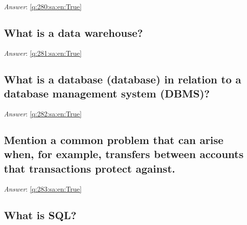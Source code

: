 \documentclass[a4paper,11pt,oneside]{article}
\begin{document}
\begin{sloppypar}
\textit{Answer}: \autoref{q:280:sa:en:True}



\subsection{What is a data warehouse?}

\label{q:281:sa:en:False}

\vspace{2cm}

\noindent\makebox[\textwidth]{\hrulefill}

\vspace{1cm}

\textit{Answer}: \autoref{q:281:sa:en:True}



\subsection{What is a database (database) in relation to a database management system (DBMS)?}

\label{q:282:sa:en:False}

\vspace{2cm}

\noindent\makebox[\textwidth]{\hrulefill}

\vspace{1cm}

\textit{Answer}: \autoref{q:282:sa:en:True}



\subsection{Mention a common problem that can arise when, for example, transfers between accounts that transactions protect against.}

\label{q:283:sa:en:False}

\vspace{2cm}

\noindent\makebox[\textwidth]{\hrulefill}

\vspace{1cm}

\textit{Answer}: \autoref{q:283:sa:en:True}



\subsection{What is SQL?}


\end{sloppypar}
\end{document}
